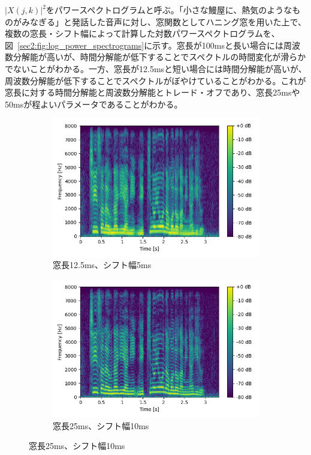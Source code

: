 \documentclass[12pt]{jarticle}
\numberwithin{equation}{section}    %
\numberwithin{figure}{section}      %
\numberwithin{table}{section}      %
\begin{document}
$|X(j, k)|^{2}$をパワースペクトログラムと呼ぶ。「小さな鰻屋に、熱気のようなものがみなぎる」と発話した音声に対し、窓関数としてハニング窓を用いた上で、複数の窓長・シフト幅によって計算した対数パワースペクトログラムを、図~\ref{sec2:fig:log_power_spectrograms}に示す。窓長が100msと長い場合には周波数分解能が高いが、時間分解能が低下することでスペクトルの時間変化が滑らかでないことがわかる。一方、窓長が12.5msと短い場合には時間分解能が高いが、周波数分解能が低下することでスペクトルがぼやけていることがわかる。これが窓長に対する時間分解能と周波数分解能とトレード・オフであり、窓長25msや50msが程よいパラメータであることがわかる。
\begin{figure}[tb]
    \centering
    \begin{subfigure}[b]{0.48\textwidth}
        \centering
        \includegraphics[width=\textwidth]{./figure/sec2/spectrogram_1.png}
        \caption{窓長12.5ms、シフト幅5ms}
        \label{sec2:fig:spectrogram1}
    \end{subfigure}
    \begin{subfigure}[b]{0.48\textwidth}
        \centering
        \includegraphics[width=\textwidth]{./figure/sec2/spectrogram_2.png}
        \caption{窓長25ms、シフト幅10ms}
        \label{sec2:fig:spectrogram2}
    \end{subfigure}


\end{figure}
\end{document}
